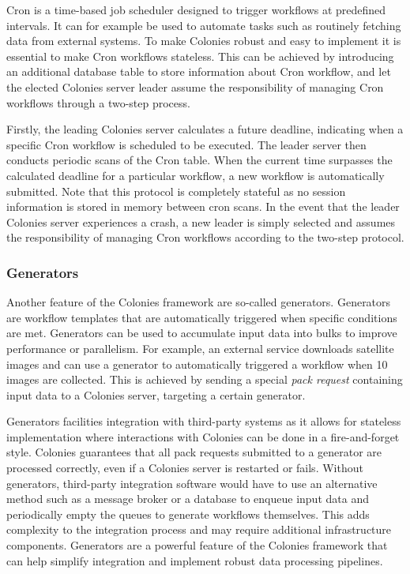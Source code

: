 \documentclass{article}
\begin{document}
Cron is a time-based job scheduler designed to trigger workflows at predefined intervals. It can for example be used to automate tasks such as routinely fetching data from external systems. To make Colonies robust and easy to implement it is essential to make Cron workflows stateless. This can be achieved by introducing an additional database table to store information about Cron workflow, and let the elected Colonies server leader assume the responsibility of managing Cron workflows through a two-step process. 

Firstly, the leading Colonies server calculates a future deadline, indicating when a specific Cron workflow is scheduled to be executed. The leader server then conducts periodic scans of the Cron table. When the current time surpasses the calculated deadline for a particular workflow, a new workflow is automatically submitted. Note that this protocol is completely stateful as no session information is stored in memory between cron scans. In the event that the leader Colonies server experiences a crash, a new leader is simply selected and assumes the responsibility of managing Cron workflows according to the two-step protocol.

\subsubsection{Generators}
Another feature of the Colonies framework are so-called generators. Generators are workflow templates that are automatically triggered when specific conditions are met. Generators can be used to accumulate input data into bulks to improve performance or parallelism. For example, an external service downloads satellite images and can use a generator to automatically triggered a workflow when 10 images are collected. This is achieved by sending a special \emph{pack request} containing input data to a Colonies server, targeting a certain generator. 

Generators facilities integration with third-party systems as it allows for stateless implementation where interactions with Colonies can be done in a fire-and-forget style. Colonies guarantees that all pack requests submitted to a generator are processed correctly, even if a Colonies server is restarted or fails. Without generators, third-party integration software would have to use an alternative method such as a message broker or a database to enqueue input data and periodically empty the queues to generate workflows themselves. This adds complexity to the integration process and may require additional infrastructure components. Generators are a powerful feature of the Colonies framework that can help simplify integration and implement robust data processing pipelines.
\end{document}
